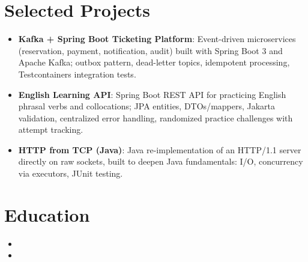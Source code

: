 \documentclass[11pt,a4paper,sans]{moderncv}
\begin{document}
\section{Selected Projects}
\vspace{1pt}
\begin{itemize}

\item \textbf{Kafka + Spring Boot Ticketing Platform}: Event-driven microservices (reservation, payment, notification, audit) built with Spring Boot 3 and Apache Kafka; outbox pattern, dead-letter topics, idempotent processing, Testcontainers integration tests.

\item \textbf{English Learning API}: Spring Boot REST API for practicing English phrasal verbs and collocations; JPA entities, DTOs/mappers, Jakarta validation, centralized error handling, randomized practice challenges with attempt tracking.

\item \textbf{HTTP from TCP (Java)}: Java re-implementation of an HTTP/1.1 server directly on raw sockets, built to deepen Java fundamentals: I/O, concurrency via executors, JUnit testing.

\end{itemize}


\section{Education}
\vspace{1pt}
\begin{itemize}

\item{}

\vspace{3pt}

\item{}

\end{itemize}
\end{document}
